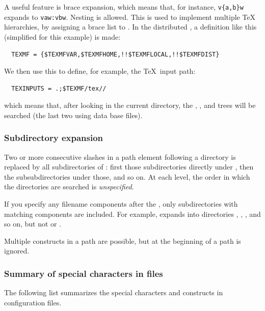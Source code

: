 \documentclass[12pt]{article}
\begin{document}
A useful feature is brace expansion, which means that, for instance,
\verb+v{a,b}w+ expands to \verb+vaw:vbw+. Nesting is allowed.
This is used to implement multiple \TeX{} hierarchies, by
assigning a brace list to .
In the distributed , a definition like this
(simplified for this example) is made:
\begin{verbatim}
  TEXMF = {$TEXMFVAR,$TEXMFHOME,!!$TEXMFLOCAL,!!$TEXMFDIST}
\end{verbatim}
We then use this to define, for example, the \TeX\ input path:
\begin{verbatim}
  TEXINPUTS = .;$TEXMF/tex//
\end{verbatim}
which means that, after looking in the current directory, the
, , 
and  trees will be searched (the
last two using  data base files).

\subsubsection{Subdirectory expansion}
\label{sec:subdirectory-expansion}

Two or more consecutive slashes in a path element following a directory
 is replaced by all subdirectories of : first those
subdirectories directly under , then the subsubdirectories under
those, and so on.  At each level, the order in which the directories are
searched is \emph{unspecified}.

If you specify any filename components after the \samp{//}, only
subdirectories with matching components are included.  For example,
 expands into directories , ,
, and so on, but not  or .

Multiple \samp{//} constructs in a path are possible, but
\samp{//} at the beginning of a path is ignored.

\subsubsection{Summary of special characters in  files}
\label{sec:cnf-special-chars}

The following list summarizes the special characters and constructs in
\KPS{} configuration files.
\end{document}
